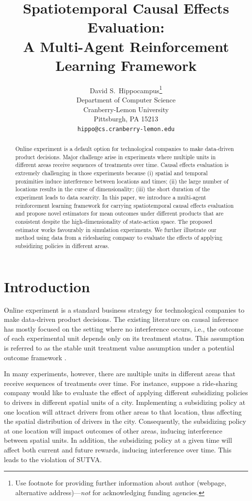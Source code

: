 \documentclass{article}
\title{Spatiotemporal Causal Effects Evaluation:\\ A Multi-Agent Reinforcement Learning Framework}
\author{%
	David S.~Hippocampus\thanks{Use footnote for providing further information
		about author (webpage, alternative address)---\emph{not} for acknowledging
		funding agencies.} \\
	Department of Computer Science\\
	Cranberry-Lemon University\\
	Pittsburgh, PA 15213 \\
	\texttt{hippo@cs.cranberry-lemon.edu} \\
}
\begin{document}
	
\maketitle

\begin{abstract}
	Online experiment is a default option for technological companies to make data-driven product decisions. Major challenge arise in experiments where multiple units in different areas receive sequences of treatments over time. Causal effects evaluation is extremely challenging in those experiments because (i) spatial and temporal proximities induce interference between locations and times; (ii) the large number of locations results in the curse of dimensionality; (iii) the short duration of the experiment leads to data scarcity. In this paper, we introduce a multi-agent reinforcement learning framework for carrying spatiotemporal causal effects evaluation and propose novel estimators for mean outcomes under different products that are consistent despite the high-dimensionality of state-action space. The proposed estimator works favourably in simulation experiments. We further illustrate our method using data from a ridesharing company to evaluate the effects of applying subsidizing policies in different areas. 
\end{abstract}
	
\section{Introduction}
Online experiment is a standard business strategy for technological companies to make data-driven product decisions. The existing literature on causal inference has mostly focused on the setting where no interference occurs, i.e., the outcome of each experimental unit depends only on its treatment status. This assumption is referred to as the stable unit treatment value assumption \citep[SUTVA,][]{rubin1980randomization,rubin1986comment} under a potential outcome framework \citep[see, e.g.,][]{rubin2005}. 

In many experiments, however, there are multiple units in different areas that receive sequences of treatments over time. For instance, suppose a ride-sharing company would like to evaluate the effect of applying different subsidizing policies to drivers in different spatial units of a city. Implementing a subsidizing policy at one location will attract drivers from other areas to that location, thus affecting the spatial distribution of drivers in the city. Consequently, the subsidizing policy at one location will impact outcomes of other areas, inducing interference between spatial units. In addition, the subsidizing policy at a given time will affect both current and future rewards, inducing interference over time. This leads to the violation of SUTVA.
\end{document}

